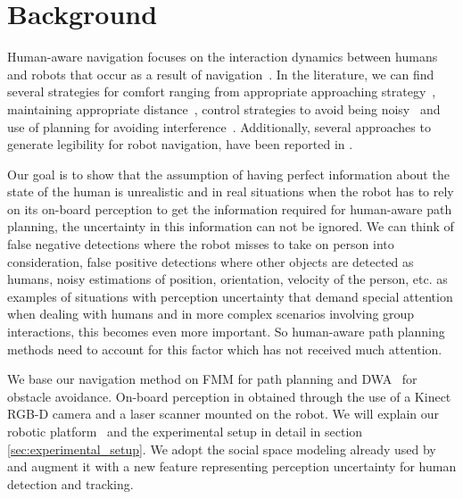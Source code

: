 \section{Background}
\label{sec:background}
Human-aware navigation focuses on the interaction dynamics between humans and robots that occur as a result of navigation~\cite{Kruse2013}. In the literature, we can find several strategies for comfort ranging from appropriate approaching strategy~\cite{Dautenhahn2006}, maintaining appropriate distance~\cite{Takayama2009}, control strategies to avoid being noisy~\cite{Martinson2007} and use of planning for avoiding interference~\cite{Vasquez2012}. Additionally, several approaches to generate legibility for robot navigation, have been reported in \cite{lichtenthaler2013towards}.

Our goal is to show that the assumption of having perfect information about the state of the human is unrealistic and in real situations when the robot has to rely on its on-board perception to get the information required for human-aware path planning, the uncertainty in this information can not be ignored. We can think of false negative detections where the robot misses to take on person into consideration, false positive detections where other objects are detected as humans, noisy estimations of position, orientation, velocity of the person, etc. as examples of situations with perception uncertainty that demand special attention when dealing with humans and in more complex scenarios involving group interactions, this becomes even more important. So human-aware path planning methods need to account for this factor which has not received much attention.

We base our navigation method on FMM \cite{ventura2015} for path planning and DWA~\cite{fox1997dynamic} for obstacle avoidance. On-board perception in obtained through the use of a Kinect RGB-D camera and a laser scanner mounted on the robot. We will explain our robotic platform~\cite{Messias2014robotic} and the experimental setup in detail in section \ref{sec:experimental_setup}. We adopt the social space modeling already used by \cite{kirby2009companion,gomez2014fast} and augment it with a new feature representing perception uncertainty for human detection and tracking.

